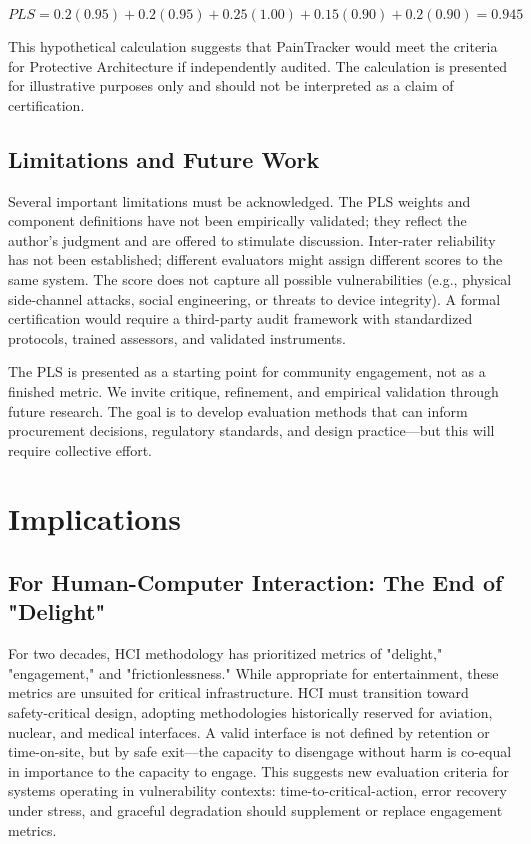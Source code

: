 \documentclass[acmsmall,review]{acmart}
\begin{document}
\[
PLS = 0.2(0.95) + 0.2(0.95) + 0.25(1.00) + 0.15(0.90) + 0.2(0.90) = 0.945
\]

This hypothetical calculation suggests that PainTracker would meet the criteria for Protective Architecture if independently audited. The calculation is presented for illustrative purposes only and should not be interpreted as a claim of certification.

\subsection{Limitations and Future Work}

Several important limitations must be acknowledged. The PLS weights and component definitions have not been empirically validated; they reflect the author's judgment and are offered to stimulate discussion. Inter-rater reliability has not been established; different evaluators might assign different scores to the same system. The score does not capture all possible vulnerabilities (e.g., physical side-channel attacks, social engineering, or threats to device integrity). A formal certification would require a third-party audit framework with standardized protocols, trained assessors, and validated instruments.

The PLS is presented as a starting point for community engagement, not as a finished metric. We invite critique, refinement, and empirical validation through future research. The goal is to develop evaluation methods that can inform procurement decisions, regulatory standards, and design practice---but this will require collective effort.

\section{Implications}

\subsection{For Human-Computer Interaction: The End of "Delight"}

For two decades, HCI methodology has prioritized metrics of "delight," "engagement," and "frictionlessness." While appropriate for entertainment, these metrics are unsuited for critical infrastructure. HCI must transition toward safety-critical design, adopting methodologies historically reserved for aviation, nuclear, and medical interfaces. A valid interface is not defined by retention or time-on-site, but by safe exit---the capacity to disengage without harm is co-equal in importance to the capacity to engage. This suggests new evaluation criteria for systems operating in vulnerability contexts: time-to-critical-action, error recovery under stress, and graceful degradation should supplement or replace engagement metrics.
\end{document}
